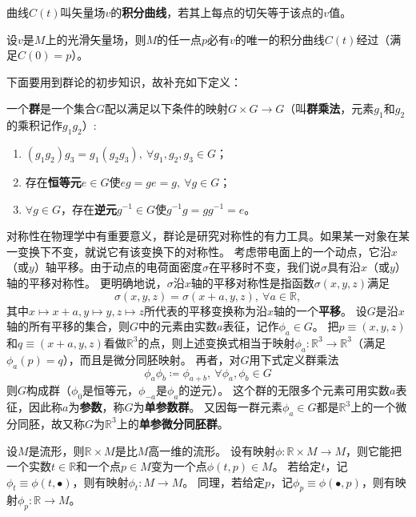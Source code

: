 \begin{definition}
曲线$C(t)$叫矢量场$v$的\textbf{积分曲线}，若其上每点的切矢等于该点的$v$值。
\end{definition}

\begin{theorem}
设$v$是$M$上的光滑矢量场，则$M$的任一点$p$必有$v$的唯一的积分曲线$C(t)$经过（满足$C(0) = p$）。
\end{theorem}

下面要用到群论的初步知识，故补充如下定义：

\begin{definition}
一个\textbf{群}是一个集合$G$配以满足以下条件的映射$G \times G \to G$（叫\textbf{群乘法}，元素$g_1$和$g_2$的乘积记作$g_1g_2$）:
\begin{enumerate}[（a）]
\item $(g_1g_2)g_3 = g_1(g_2g_3), ~ \forall g_1, g_2, g_3 \in G$；
\item 存在\textbf{恒等元}$e \in G$使$eg = ge = g, ~ \forall g \in G$；
\item $\forall g \in G$，存在\textbf{逆元}$g^{-1} \in G$使$g^{-1}g = gg^{-1} = e$。
\end{enumerate}
\end{definition}

对称性在物理学中有重要意义，群论是研究对称性的有力工具。如果某一对象在某一变换下不变，就说它有该变换下的对称性。
考虑带电面上的一个动点，它沿$x$（或$y$）轴平移。由于动点的电荷面密度$\sigma$在平移时不变，我们说$\sigma$具有沿$x$（或$y$）轴的平移对称性。
更明确地说，$\sigma$沿$x$轴的平移对称性是指函数$\sigma(x, y, z)$满足
$$\sigma(x, y, z) = \sigma(x + a, y, z), ~ \forall a \in \mathbb{R},$$
其中$x \mapsto x + a, y \mapsto y, z \mapsto z$所代表的平移变换称为沿$x$轴的一个\textbf{平移}。
设$G$是沿$x$轴的所有平移的集合，则$G$中的元素由实数$a$表征，记作$\phi_a \in G$。
把$p \equiv (x, y, z)$和$q \equiv (x + a, y, z)$看做$\mathbb{R}^3$的点，则上述变换式相当于映射$\phi_a \colon \mathbb{R}^3 \to \mathbb{R}^3$（满足$\phi_a(p) = q$），而且是微分同胚映射。
再者，对$G$用下式定义群乘法
$$\phi_a\phi_b \coloneq \phi_{a + b}, ~ \forall \phi_a, \phi_b \in G$$
则$G$构成群（$\phi_0$是恒等元，$\phi_{-a}$是$\phi_a$的逆元）。
这个群的无限多个元素可用实数$a$表征，因此称$a$为\textbf{参数}，称$G$为\textbf{单参数群}。
又因每一群元素$\phi_a \in G$都是$\mathbb{R}^3$上的一个微分同胚，故又称$G$为$\mathbb{R}^3$上的\textbf{单参微分同胚群}。

设$M$是流形，则$\mathbb{R} \times M$是比$M$高一维的流形。
设有映射$\phi \colon \mathbb{R} \times M \to M$，则它能把一个实数$t \in \mathbb{R}$和一个点$p \in M$变为一个点$\phi(t, p) \in M$。
若给定$t$，记$\phi_t \equiv \phi(t, \bullet)$，则有映射$\phi_t \colon M \to M$。
同理，若给定$p$，记$\phi_p \equiv \phi(\bullet, p)$，则有映射$\phi_p \colon \mathbb{R} \to M$。

